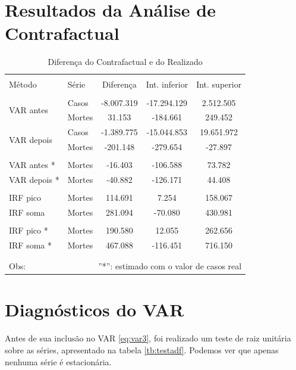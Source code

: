 \documentclass[
	12pt,				%
	oneside,			%
	a4paper,			%
	english,			%
	brazil				%
	hyperref = {colorlinks, citecolor=c1d, linkcolor=c2d, urlcolor=c3d, colorlinks}
	]{abntex2}
\begin{document}
\newpage
\begin{apendicesenv}
\chapter{Resultados da Análise de Contrafactual}\label{ap:count}
\begin{table}[H] \centering 
\renewcommand{\arraystretch}{1.2}
  \caption{Diferença do Contrafactual e do Realizado}\label{tb:counter} 
\begin{tabular}{@{\extracolsep{5pt}} llccc} 
\\[-1.8ex]\hline 
\hline \\[-1.8ex] 
Método & Série & Diferença & Int. inferior & Int. superior \\ 
\hline \\[-1.8ex] 
\multirow{2}{*}{VAR antes}  & Casos     & -8.007.319    & -17.294.129   & 2.512.505 \\ 
                            & Mortes    & 31.153        & -184.661      & 249.452 \\ 
\multirow{2}{*}{VAR depois} & Casos     & -1.389.775    & -15.044.853   & 19.651.972 \\ 
                            & Mortes    & -201.148      & -279.654      & -27.897 \\
\\[-1.8ex] 
VAR antes *                 & Mortes    & -16.403       & -106.588      & 73.782  \\ 
VAR depois *                & Mortes    & -40.882       & -126.171      & 44.408  \\ 
\\
IRF pico                    & Mortes    & 114.691       & 7.254         & 158.067 \\
IRF soma                    & Mortes    & 281.094       & -70.080       & 430.981 \\
\\[-1.8ex] 
IRF pico *                  & Mortes    & 190.580       & 12.055        & 262.656 \\
IRF soma *                  & Mortes    & 467.088       & -116.451        & 716.150 \\
\\[-1.8ex]\hline 
\hline \\[-1.8ex] 
Obs: & \multicolumn{4}{r}{''*'': estimado com o valor de casos real}
\end{tabular} 
\end{table} 


\chapter{Diagnósticos do VAR}\label{ap:diag}
Antes de sua inclusão no VAR \eqref{eq:var3}, foi realizado um teste de raiz unitária sobre as séries, apresentado na tabela \ref{tb:testadf}. Podemos ver que apenas nenhuma série é estacionária.


\end{apendicesenv}
\end{document}

